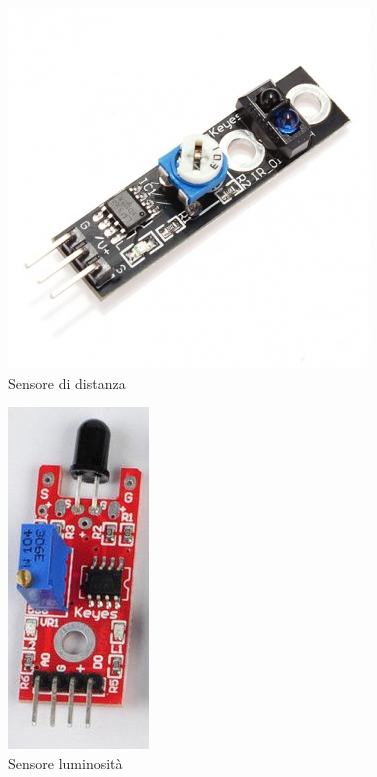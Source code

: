 \documentclass[a4paper,titlepage]{book}
\begin{document}
\begin{figure}[!ht]
\centering
\includegraphics[scale=0.5]{dist2.jpg}
\caption{Sensore di distanza}
\end{figure}


\begin{figure}[!ht]
\centering
\includegraphics[scale=0.6]{lumi.png}
\caption{Sensore luminosità}
\end{figure}
\end{document}
